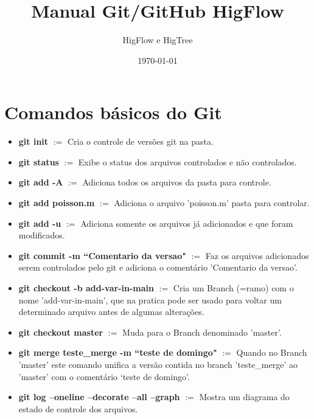 \documentclass[12pt]{article}
\begin{document}
\title{Manual Git/GitHub HigFlow}
\author{HigFlow e HigTree}
\date{\today}
\maketitle

\section{Comandos básicos do Git}\label{sec:comandos_pc}

\begin{itemize}
	\item \textbf{git init} $:=$ Cria o controle de versões git na pasta.
	
	\item \textbf{git status} $:=$ Exibe o status dos arquivos controlados e não controlados.
	
	\item \textbf{git add -A} $:=$ Adiciona todos os arquivos da pasta para controle.
	
	\item \textbf{git add poisson.m} $:=$ Adiciona o arquivo 'poisson.m' pasta para controlar.
	
	\item \textbf{git add -u} $:=$ Adiciona somente os arquivos já adicionados e que foram modificados.
	
	\item \textbf{git commit -m ``Comentario da versao"} $:=$ Faz os arquivos adicionados serem controlados pelo git e adiciona o comentário 'Comentario da versao'.
	
	\item \textbf{git checkout -b add-var-in-main} $:=$ Cria um Branch (=ramo) com o nome 'add-var-in-main', que na pratica pode ser usado para voltar um determinado arquivo antes de algumas alterações. 
	
	\item \textbf{git checkout master} $:=$ Muda para o Branch denominado 'master'.
	
	\item \textbf{git merge teste\_merge -m ``teste de domingo"} $:=$ Quando no Branch 'master' este comando unifica a versão contida no branch 'teste\_merge' ao 'master' com o comentário `teste de domingo'.
	
	\item \textbf{git log --oneline --decorate --all --graph} $:=$ Mostra um diagrama do estado de controle dos arquivos.
	

\end{itemize}
\end{document}
